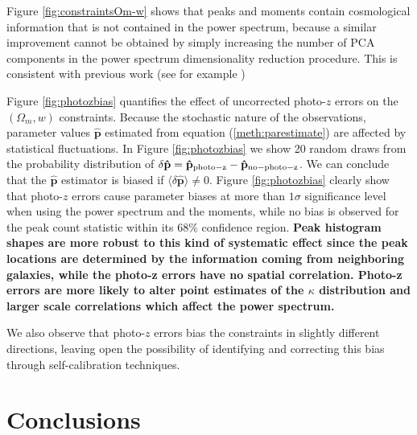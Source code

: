 \documentclass[reprint,aps,prd,superscriptaddress,showkeys,showpacs]{revtex4-1}
\newcommand{\bbh}[1]{\mathbf{\hat{#1}}}
\begin{document}
Figure \ref{fig:constraintsOm-w} shows that peaks and moments contain cosmological information that is not contained in the power spectrum, because a similar improvement cannot be obtained by simply increasing the number of PCA components in the power spectrum dimensionality reduction procedure. This is consistent with previous work (see for example \citep{CFHTMink})

Figure \ref{fig:photozbias} quantifies the effect of uncorrected photo-$z$ errors on the $(\Omega_m,w)$ constraints. Because the stochastic nature of the observations, parameter values $\bbh{p}$ estimated from equation (\ref{meth:parestimate}) are affected by statistical fluctuations. In Figure \ref{fig:photozbias} we show 20 random draws from the probability distribution of $\delta \bbh{p}=\bbh{p}_{\rm photo-z}-\bbh{p}_{\rm no-photo-z}$. We can conclude that the $\bbh{p}$ estimator is biased if $\langle\delta\bbh{p}\rangle\neq 0$. Figure \ref{fig:photozbias} clearly show that photo-$z$ errors cause parameter biases at more than $1\sigma$ significance level when using the power spectrum and the moments, while no bias is observed for the peak count statistic within its 68\% confidence region. {\bf \color{red} Peak histogram shapes are more robust to this kind of systematic effect since the peak locations are determined by the information coming from neighboring galaxies, while the photo-z errors have no spatial correlation. Photo-z errors are more likely to alter point estimates of the $\kappa$ distribution and larger scale correlations which affect the power spectrum.} 

We also observe that photo-$z$ errors bias the constraints in slightly different directions, leaving open the possibility of identifying and correcting this bias through self-calibration techniques.         


\section{Conclusions}
\label{sec:conclusions}
\end{document}
